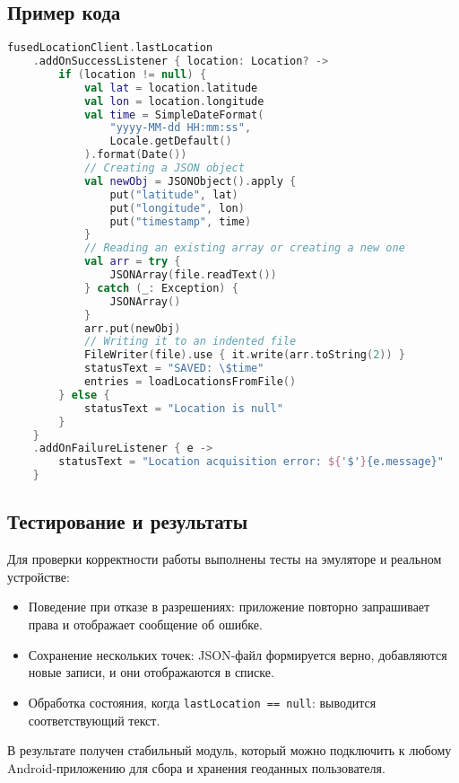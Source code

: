 \subsection*{Пример кода}

\begin{lstlisting}[language=Kotlin, caption={Запись новой локации в файл}]
fusedLocationClient.lastLocation
    .addOnSuccessListener { location: Location? ->
        if (location != null) {
            val lat = location.latitude
            val lon = location.longitude
            val time = SimpleDateFormat(
                "yyyy-MM-dd HH:mm:ss",
                Locale.getDefault()
            ).format(Date())
            // Creating a JSON object
            val newObj = JSONObject().apply {
                put("latitude", lat)
                put("longitude", lon)
                put("timestamp", time)
            }
            // Reading an existing array or creating a new one
            val arr = try {
                JSONArray(file.readText())
            } catch (_: Exception) {
                JSONArray()
            }
            arr.put(newObj)
            // Writing it to an indented file
            FileWriter(file).use { it.write(arr.toString(2)) }
            statusText = "SAVED: \$time"
            entries = loadLocationsFromFile()
        } else {
            statusText = "Location is null"
        }
    }
    .addOnFailureListener { e ->
        statusText = "Location acquisition error: ${'$'}{e.message}"
    }
\end{lstlisting}

\subsection*{Тестирование и результаты}

Для проверки корректности работы выполнены тесты на эмуляторе и реальном устройстве:
\begin{itemize}
    \item Поведение при отказе в разрешениях: приложение повторно запрашивает права и отображает сообщение об ошибке.
    \item Сохранение нескольких точек: JSON‑файл формируется верно, добавляются новые записи, и они отображаются в списке.
    \item Обработка состояния, когда \texttt{lastLocation == null}: выводится соответствующий текст.
\end{itemize}

В результате получен стабильный модуль, который можно подключить к любому Android‑приложению для сбора и хранения геоданных пользователя.
